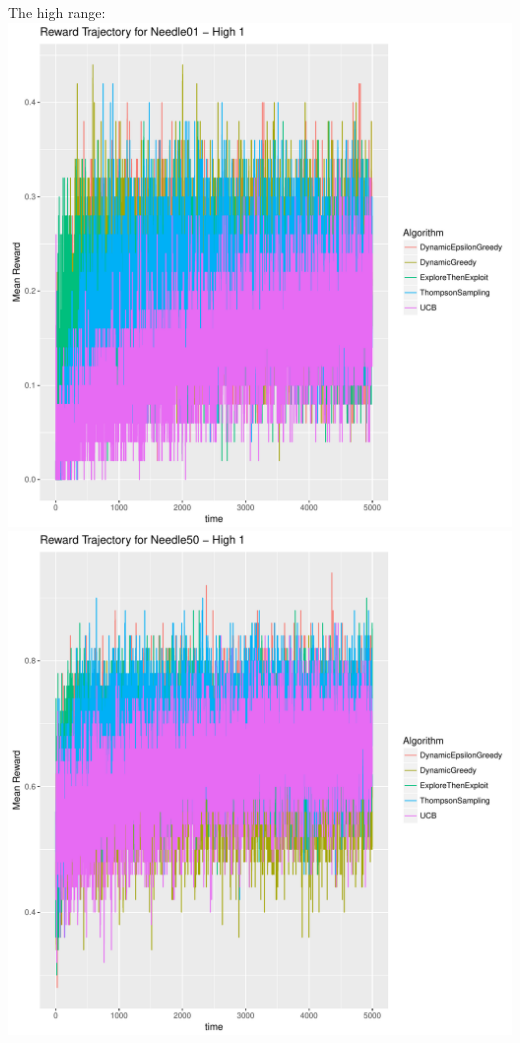 \documentclass[11pt,letterpaper]{article}
\begin{document}
The high range: \\
\includegraphics[scale=0.5]{"../results/Reward Trajectory for Needle01 - High 1"} \\
\includegraphics[scale=0.5]{"../results/Reward Trajectory for Needle50 - High 1"} \\
\end{document}
